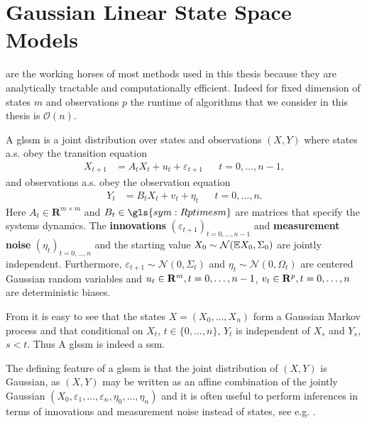 \section{Gaussian Linear State Space Models}
\label{sec:linear_gaussian_state_space_models}

 are the working horses of most methods used in this thesis because they are analytically tractable and computationally efficient. Indeed for fixed dimension of states $m$ and observations $p$ the runtime of algorithms that we consider in this thesis is $\mathcal O(n)$.

\begin{definition}
    \label{def:glssm}
    A \acrfull{glssm} is a joint distribution over states and observations $(X,Y)$ where states a.s. obey the transition equation
    \begin{align}
        \label{eq:glssm_states}
        X_{t + 1} & = A_{t}X_{t} + u_{t} + \varepsilon_{t + 1} &  & t = 0, \dots, n - 1,
    \end{align}
    and observations a.s. obey the observation equation
    \begin{align}
        \label{eq:glssm_observations}
        Y_{t} & = B_{t}X_{t} + v_{t} + \eta_{t} &  & t = 0, \dots, n.
    \end{align}
    Here $A_{t} \in \mathbf{R}^{m \times m}$ and $B_{t} \in \gls{sym:Rptimesm}$ are matrices that specify the systems dynamics. The \textbf{innovations} $(\varepsilon_{t + 1})_{t = 0, \dots, n-1}$ and \textbf{measurement noise} $(\eta_{t})_{t = 0, \dots, n}$ and the  starting value $X_{0} \sim \mathcal N (\mathbb E X_{0}, \Sigma_{0})$ are jointly independent. Furthermore, $\varepsilon_{t+1} \sim \mathcal N(0, \Sigma_{t})$ and $\eta_{t}\sim \mathcal N(0, \Omega_{t})$ are centered Gaussian random variables and $u_{t} \in \mathbf R^{m}, t = 0, \dots, n - 1$, $v_{t} \in \mathbf R^{p}, t = 0, \dots, n$ are deterministic biases.
\end{definition}

\begin{remark}
    From  it is easy to see that the states $X = (X_{0}, \dots, X_{n})$ form a Gaussian Markov process and that conditional on $X_{t}$, $t \in \{0, \dots, n\}$, $Y_{t}$ is independent of $X_{s}$ and $Y_{s}$, $s < t$. Thus A \acrshort{glssm} is indeed a \acrshort{ssm}.
\end{remark}


The defining feature of a \gls{glssm} is that the joint distribution of $(X,Y)$ is Gaussian, as $(X,Y)$ may be written as an affine combination of the jointly Gaussian $(X_{0}, \varepsilon_{1}, \dots, \varepsilon_{n}, \eta_{0}, \dots, \eta_{n})$ and it is often useful to perform inferences in terms of innovations and measurement noise instead of states, see e.g. \citep[Section 4.5]{Durbin2012Time}.

